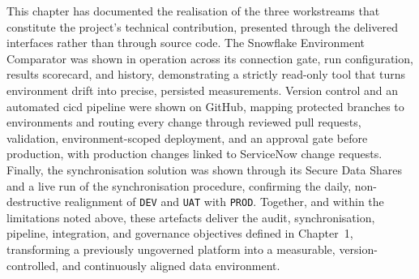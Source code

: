 This chapter has documented the realisation of the three workstreams that constitute the project's technical contribution, presented through the delivered interfaces rather than through source code. The Snowflake Environment Comparator was shown in operation across its connection gate, run configuration, results scorecard, and history, demonstrating a strictly read-only tool that turns environment drift into precise, persisted measurements. Version control and an automated \gls{cicd} pipeline were shown on GitHub, mapping protected branches to environments and routing every change through reviewed pull requests, validation, environment-scoped deployment, and an approval gate before production, with production changes linked to ServiceNow change requests. Finally, the synchronisation solution was shown through its Secure Data Shares and a live run of the synchronisation procedure, confirming the daily, non-destructive realignment of \texttt{DEV} and \texttt{UAT} with \texttt{PROD}. Together, and within the limitations noted above, these artefacts deliver the audit, synchronisation, pipeline, integration, and governance objectives defined in Chapter~1, transforming a previously ungoverned platform into a measurable, version-controlled, and continuously aligned data environment.

\newpage
